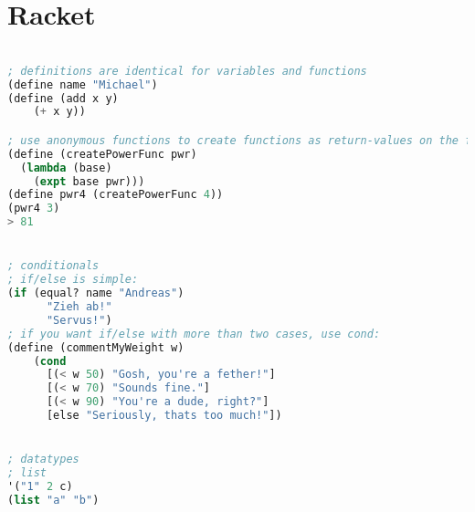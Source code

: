 \section{Racket}

\begin{lstlisting}[language=lisp]

; definitions are identical for variables and functions
(define name "Michael")
(define (add x y)
    (+ x y))

; use anonymous functions to create functions as return-values on the fly
(define (createPowerFunc pwr)
  (lambda (base)
    (expt base pwr)))
(define pwr4 (createPowerFunc 4))
(pwr4 3)
> 81


; conditionals
; if/else is simple:
(if (equal? name "Andreas")
      "Zieh ab!"
      "Servus!")
; if you want if/else with more than two cases, use cond:
(define (commentMyWeight w)
    (cond
      [(< w 50) "Gosh, you're a fether!"]
      [(< w 70) "Sounds fine."]
      [(< w 90) "You're a dude, right?"]
      [else "Seriously, thats too much!"])


; datatypes
; list
'("1" 2 c)
(list "a" "b")


\end{lstlisting}


